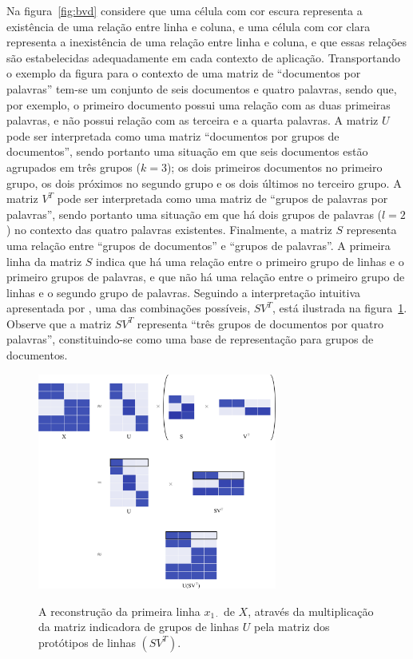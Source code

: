 \documentclass[
    12pt,                %
    oneside,            %
    a4paper,            %
    english,            %
    brazil                %
    ]{abntex2ppgsi}
\begin{document}
Na figura~\ref{fig:bvd} considere que uma célula com cor escura representa a existência de uma relação entre linha e coluna, e uma célula com cor clara representa a inexistência de uma relação entre linha e coluna, e que essas relações são estabelecidas adequadamente em cada contexto de aplicação. Transportando o exemplo da figura para o contexto de uma matriz de ``documentos por palavras'' tem-se um conjunto de seis documentos e quatro palavras, sendo que, por exemplo, o primeiro documento possui uma relação com as duas primeiras palavras, e não possui relação com as terceira e a quarta palavras. A matriz $U$ pode ser interpretada como uma matriz ``documentos por grupos de documentos'', sendo portanto uma situação em que seis documentos estão agrupados em três grupos ($k = 3$); os dois primeiros documentos no primeiro grupo, os dois próximos no segundo grupo e os dois últimos no terceiro grupo. A matriz $V^T$ pode ser interpretada como uma matriz de ``grupos de palavras por palavras'', sendo portanto uma situação em que há dois grupos de palavras ($l = 2$) no contexto das quatro palavras existentes. Finalmente, a matriz $S$ representa uma relação entre ``grupos de documentos'' e ``grupos de palavras''. A primeira linha da matriz $S$ indica que há uma relação entre o primeiro grupo de linhas e o primeiro grupos de palavras, e que não há uma relação entre o primeiro grupo de linhas e o segundo grupo de palavras. Seguindo a interpretação intuitiva apresentada por \cite{Long2005}, uma das combinações possíveis, $SV^T$, está ilustrada na figura~\ref{fig:bvd:reconstruction}. Observe que a matriz $SV^T$ representa ``três grupos de documentos por quatro palavras'', constituindo-se como uma base de representação para grupos de documentos.

\begin{figure}[H]
\centering
    \caption{
        A reconstrução da primeira linha $x_{1 \cdot}$ de $X$, através da multiplicação da matriz indicadora de grupos de linhas $U$ pela matriz dos protótipos de linhas $(S V^T)$. %
    }
    \includegraphics[width=0.7\textwidth]{img/reconstruction.png}
    \label{fig:bvd:reconstruction}
\end{figure}
\end{document}
